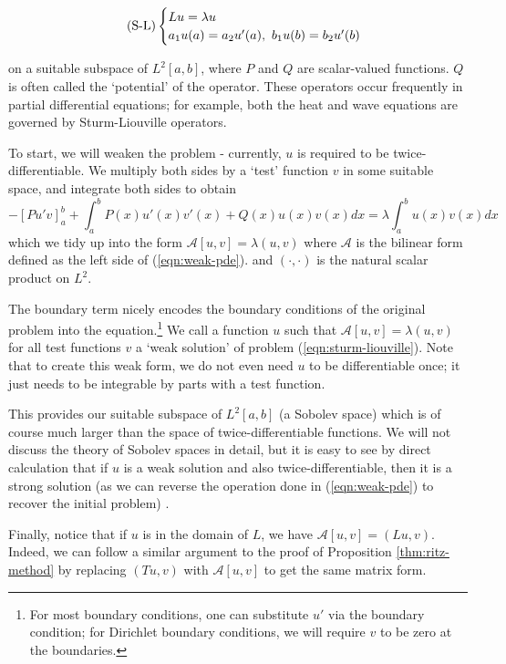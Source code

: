 \documentclass[../main.tex]{subfiles}
\begin{document}
\begin{equation*}\label{eqn:sturm-liouville}
\tag{S-L}
\begin{cases}
Lu = \lambda u$$ \\
a_1 u(a) = a_2 u'(a), \ b_1 u(b) = b_2 u'(b)
\end{cases}
\end{equation*}

on a suitable subspace of $L^2[a, b]$, where $P$ and $Q$ are scalar-valued
functions. $Q$ is often called the `potential' of the operator. These operators
occur frequently in partial differential equations; for example, both the heat
and wave equations are governed by Sturm-Liouville operators.

To start, we will weaken the problem - currently, $u$ is required to be
twice-differentiable. We multiply both sides by a `test' function $v$ in some
suitable space, and integrate both sides to obtain
\begin{equation}\label{eqn:weak-pde}
-[Pu'v]^b_a + \int_a^b P(x) u'(x) v'(x) + Q(x) u(x) v(x) dx = \lambda \int_a^b u(x) v(x) dx
\end{equation}
which we tidy up into the form 
$\mathcal{A}[u, v] = \lambda (u, v)$
where $\mathcal{A}$ is the bilinear form defined as the left side of
(\ref{eqn:weak-pde}). and $(\cdot, \cdot)$ is the natural scalar product on
$L^2$.

The boundary term nicely encodes the boundary conditions of the original
problem into the equation.\footnote{For most boundary conditions, one can
substitute $u'$ via the boundary condition; for Dirichlet boundary conditions,
we will require $v$ to be zero at the boundaries.} We call a function $u$ such
that $\mathcal{A}[u, v] = \lambda (u, v)$ for all test functions $v$ a `weak
solution' of problem (\ref{eqn:sturm-liouville}). Note that to create this weak
form, we do not even need $u$ to be differentiable once; it just needs to be
integrable by parts with a test function.

This provides our suitable subspace of $L^2[a, b]$ (a Sobolev space) which is of
course much larger than the space of twice-differentiable functions. We will not
discuss the theory of Sobolev spaces in detail, but it is easy to see by direct
calculation that if $u$ is a weak solution and also twice-differentiable, then
it is a strong solution (as we can reverse the operation done in
(\ref{eqn:weak-pde}) to recover the initial problem)
\cite{brezis2011functional}.

Finally, notice that if $u$ is in the domain of $L$, we have $\mathcal{A}[u, v] = (Lu,
v)$. Indeed, we can follow a similar argument to the proof of Proposition \ref{thm:ritz-method}
by replacing $(Tu, v)$ with $\mathcal{A}[u, v]$ to get the same matrix form.
\end{document}
